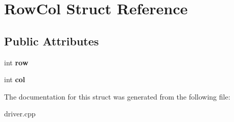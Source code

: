 \hypertarget{structRowCol}{\section{Row\-Col Struct Reference}
\label{structRowCol}
}
\subsection*{Public Attributes}
\begin{DoxyCompactItemize}
\item 
\hypertarget{structRowCol_af843a3b81abae4588a8dc70e95b36ab9}{int {\bfseries row}}\label{structRowCol_af843a3b81abae4588a8dc70e95b36ab9}

\item 
\hypertarget{structRowCol_a35a07844860ff7a34e92222f337a53a3}{int {\bfseries col}}\label{structRowCol_a35a07844860ff7a34e92222f337a53a3}

\end{DoxyCompactItemize}


The documentation for this struct was generated from the following file\-:\begin{DoxyCompactItemize}
\item 
driver.\-cpp\end{DoxyCompactItemize}
